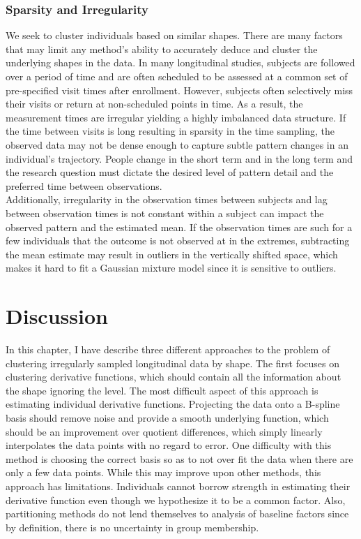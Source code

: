 \documentclass[12pt]{article}
\begin{document}
\subsubsection{Sparsity and Irregularity}
We seek to cluster individuals based on similar shapes. There are many factors that may limit any method's ability to accurately deduce and cluster the underlying shapes in the data. In many longitudinal studies, subjects are followed over a period of time and are often scheduled to be assessed at a common set of pre-specified visit times after enrollment. However, subjects often selectively miss their visits or return at non-scheduled points in time. As a result, the measurement times are irregular yielding a highly imbalanced data structure. If the time between visits is long resulting in sparsity in the time sampling, the observed data may not be dense enough to capture subtle pattern changes in an individual's trajectory. People change in the short term and in the long term and the research question must dictate the desired level of pattern detail and the preferred time between observations. \\
 
Additionally, irregularity in the observation times between subjects and lag between observation times is not constant within a subject can impact the observed pattern and the estimated mean. If the observation times are such for a few individuals that the outcome is not observed at in the extremes,  subtracting  the mean estimate may result in outliers in the vertically shifted space, which makes it hard to fit a Gaussian mixture model since it is sensitive to outliers.




\section{Discussion}
In this chapter, I have describe three different approaches to the problem of clustering irregularly sampled longitudinal data by shape. The first focuses on clustering derivative functions, which should contain all the information about the shape ignoring the level. The most difficult aspect of this approach is estimating individual derivative functions. Projecting the data onto a B-spline basis should remove noise and provide a smooth underlying function, which should be an improvement over quotient differences, which simply linearly interpolates the data points with no regard to error. One difficulty with this method is choosing the correct basis so as to not over fit the data when there are only a few data points. While this may improve upon other methods, this approach has limitations. Individuals cannot borrow strength in estimating their derivative function even though we hypothesize it to be a common factor. Also, partitioning methods do not lend themselves to analysis of baseline factors since by definition, there is no uncertainty in group membership.  \\
\end{document}
